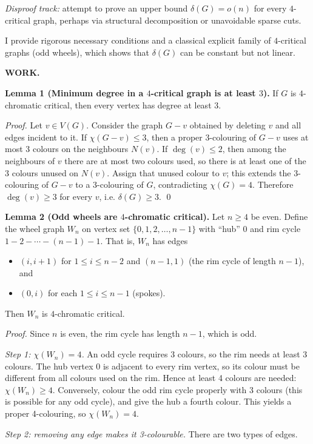 \emph{Disproof track:} attempt to prove an upper bound $\delta(G)=o(n)$ for every $4$-critical graph, perhaps via structural decomposition or unavoidable sparse cuts.

I provide rigorous necessary conditions and a classical explicit family of $4$-critical graphs (odd wheels), which shows that $\delta(G)$ can be constant but not linear.

\textbf{WORK.}

\textbf{Lemma 1 (Minimum degree in a $4$-critical graph is at least $3$).}
If $G$ is $4$-chromatic critical, then every vertex has degree at least $3$.

\emph{Proof.}
Let $v\in V(G)$. Consider the graph $G-v$ obtained by deleting $v$ and all edges incident to it.
If $\chi(G-v)\le 3$, then a proper 3-colouring of $G-v$ uses at most 3 colours on the neighbours $N(v)$.
If $\deg(v)\le 2$, then among the neighbours of $v$ there are at most two colours used, so there is at least one of the 3 colours unused on $N(v)$.
Assign that unused colour to $v$; this extends the 3-colouring of $G-v$ to a 3-colouring of $G$, contradicting $\chi(G)=4$.
Therefore $\deg(v)\ge 3$ for every $v$, i.e. $\delta(G)\ge 3$.
\qed

\medskip
\textbf{Lemma 2 (Odd wheels are $4$-chromatic critical).}
Let $n\ge 4$ be even. Define the wheel graph $W_n$ on vertex set
$\{0,1,2,\dots,n-1\}$ with ``hub'' $0$ and rim cycle $1-2-\cdots-(n-1)-1$.
That is, $W_n$ has edges
\begin{itemize}
\item $(i,i+1)$ for $1\le i\le n-2$ and $(n-1,1)$ (the rim cycle of length $n-1$), and
\item $(0,i)$ for each $1\le i\le n-1$ (spokes).
\end{itemize}
Then $W_n$ is $4$-chromatic critical.

\emph{Proof.}
Since $n$ is even, the rim cycle has length $n-1$, which is odd.

\emph{Step 1: $\chi(W_n)=4$.}
An odd cycle requires 3 colours, so the rim needs at least 3 colours.
The hub vertex $0$ is adjacent to every rim vertex, so its colour must be different from all colours used on the rim.
Hence at least 4 colours are needed: $\chi(W_n)\ge 4$.
Conversely, colour the odd rim cycle properly with 3 colours (this is possible for any odd cycle), and give the hub a fourth colour.
This yields a proper 4-colouring, so $\chi(W_n)=4$.

\emph{Step 2: removing any edge makes it 3-colourable.}
There are two types of edges.

